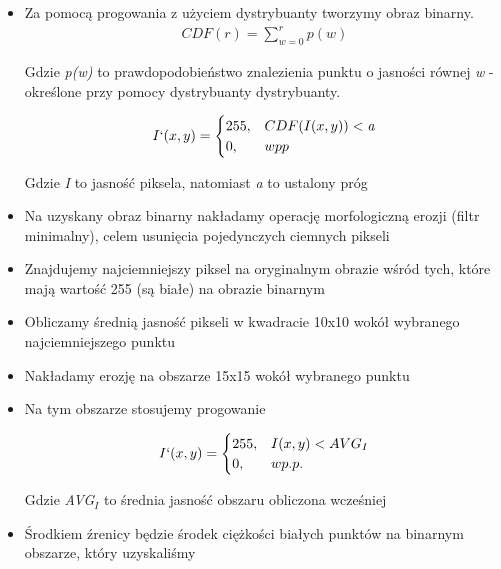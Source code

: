 \begin{itemize}
    \item Za pomocą progowania z użyciem dystrybuanty tworzymy obraz binarny.\\
    \begin{align}
        CDF(r) = \sum_{w=0}^{r} p(w)
    \end{align}
    
    Gdzie \textit{p(w)} to prawdopodobieństwo znalezienia punktu o jasności równej \textit{w} - określone przy pomocy dystrybuanty dystrybuanty.
    
    \begin{align}
        I`(x, y) = 
        \begin{cases}
            255, &  CDF(I(x, y)) < \textit{a}\\
            0,   &  wpp
        \end{cases}
    \end{align} 
    
    Gdzie \textit{I} to jasność piksela, natomiast \textit{a} to ustalony próg

    \item Na uzyskany obraz binarny nakładamy operację morfologiczną erozji (filtr minimalny), celem usunięcia pojedynczych ciemnych pikseli
    
    \item Znajdujemy najciemniejszy piksel na oryginalnym obrazie wśród tych, które mają wartość 255 (są białe) na obrazie binarnym
    
    \item Obliczamy średnią jasność pikseli w kwadracie 10x10 wokół wybranego najciemniejszego punktu
    
    \item Nakładamy erozję na obszarze 15x15 wokół wybranego punktu
    \item Na tym obszarze stosujemy progowanie
    
    \begin{align}
        I`(x, y) = 
        \begin{cases}
            255, &  I(x, y) < AVG_I\\
            0,   &  wp.p.
        \end{cases}
    \end{align}
    
    Gdzie \textit{AVG$_I$} to średnia jasność obszaru obliczona wcześniej
    
    \item Środkiem źrenicy będzie środek ciężkości białych punktów na binarnym obszarze, który uzyskaliśmy

\end{itemize}


